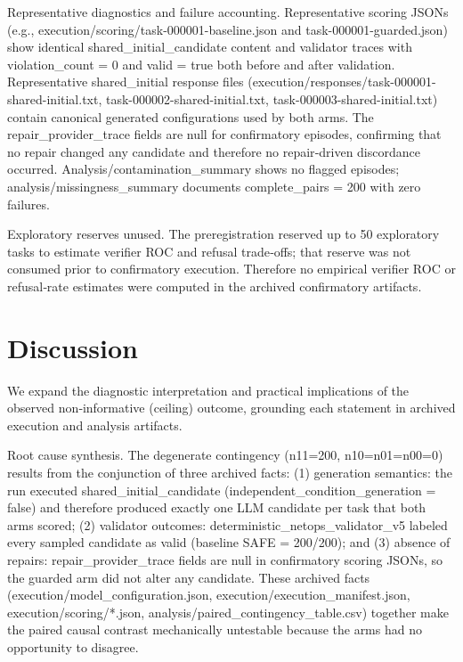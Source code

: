\documentclass[conference]{IEEEtran}
\begin{document}
Representative diagnostics and failure accounting. Representative scoring JSONs (e.g., execution/scoring/task-000001-baseline.json and task-000001-guarded.json) show identical shared\_initial\_candidate content and validator traces with violation\_count = 0 and valid = true both before and after validation. Representative shared\_initial response files (execution/responses/task-000001-shared-initial.txt, task-000002-shared-initial.txt, task-000003-shared-initial.txt) contain canonical generated configurations used by both arms. The repair\_provider\_trace fields are null for confirmatory episodes, confirming that no repair changed any candidate and therefore no repair‑driven discordance occurred. Analysis/contamination\_summary shows no flagged episodes; analysis/missingness\_summary documents complete\_pairs = 200 with zero failures.

Exploratory reserves unused. The preregistration reserved up to 50 exploratory tasks to estimate verifier ROC and refusal trade‑offs; that reserve was not consumed prior to confirmatory execution. Therefore no empirical verifier ROC or refusal‑rate estimates were computed in the archived confirmatory artifacts.

\section{Discussion}
We expand the diagnostic interpretation and practical implications of the observed non‑informative (ceiling) outcome, grounding each statement in archived execution and analysis artifacts.

Root cause synthesis. The degenerate contingency (n11=200, n10=n01=n00=0) results from the conjunction of three archived facts: (1) generation semantics: the run executed shared\_initial\_candidate (independent\_condition\_generation = false) and therefore produced exactly one LLM candidate per task that both arms scored; (2) validator outcomes: deterministic\_netops\_validator\_v5 labeled every sampled candidate as valid (baseline SAFE = 200/200); and (3) absence of repairs: repair\_provider\_trace fields are null in confirmatory scoring JSONs, so the guarded arm did not alter any candidate. These archived facts (execution/model\_configuration.json, execution/execution\_manifest.json, execution/scoring/*.json, analysis/paired\_contingency\_table.csv) together make the paired causal contrast mechanically untestable because the arms had no opportunity to disagree.
\end{document}
